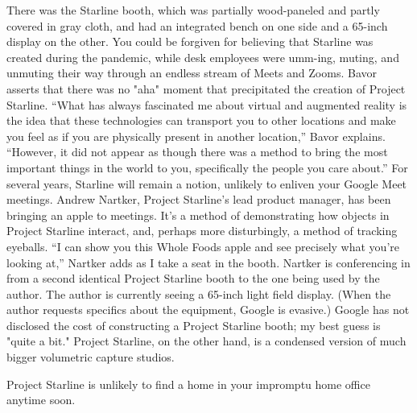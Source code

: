 There was the Starline booth, which was partially wood-paneled and partly covered in gray cloth, and had an integrated bench on one side and a 65-inch display on the other.
You could be forgiven for believing that Starline was created during the pandemic, while desk employees were umm-ing, muting, and unmuting their way through an endless stream of Meets and Zooms.
Bavor asserts that there was no "aha" moment that precipitated the creation of Project Starline.
“What has always fascinated me about virtual and augmented reality is the idea that these technologies can transport you to other locations and make you feel as if you are physically present in another location,” Bavor explains.
“However, it did not appear as though there was a method to bring the most important things in the world to you, specifically the people you care about.”
For several years, Starline will remain a notion, unlikely to enliven your Google Meet meetings.
Andrew Nartker, Project Starline's lead product manager, has been bringing an apple to meetings.
It's a method of demonstrating how objects in Project Starline interact, and, perhaps more disturbingly, a method of tracking eyeballs.
“I can show you this Whole Foods apple and see precisely what you're looking at,” Nartker adds as I take a seat in the booth.
Nartker is conferencing in from a second identical Project Starline booth to the one being used by the author.
The author is currently seeing a 65-inch light field display.
(When the author requests specifics about the equipment, Google is evasive.)
Google has not disclosed the cost of constructing a Project Starline booth; my best guess is "quite a bit." Project Starline, on the other hand, is a condensed version of much bigger volumetric capture studios.

Project Starline is unlikely to find a home in your impromptu home office anytime soon.

